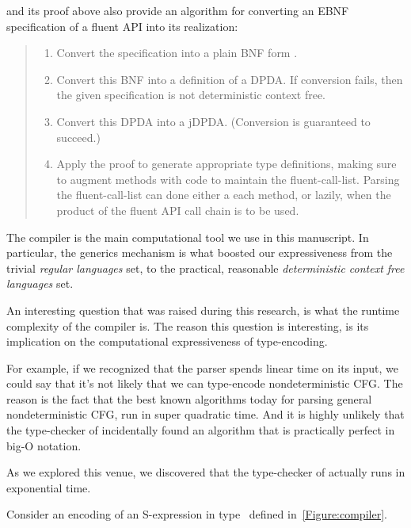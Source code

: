  and its proof above also provide
an algorithm for converting an EBNF specification of a fluent API into
its realization:
\begin{quote}
  \begin{enumerate}
    \item Convert the specification into a plain BNF form
    .
    \item Convert this BNF into a definition of a DPDA. If conversion fails,
      then the given specification is not deterministic context free. ~\cite{C1}
    \item Convert this DPDA into a jDPDA. (Conversion is guaranteed to succeed.) ~\cite{CONVERT}
    \item Apply the proof to generate appropriate \Java type definitions, making sure to
        augment methods with code to maintain the fluent-call-list.
        Parsing the fluent-call-list can done either a each method,
        or lazily, when the product of the fluent API call chain is to
         be used.
  \end{enumerate}
\end{quote}

The \Java compiler is the main computational tool we use
in this manuscript.
In particular, the \Java generics mechanism is what
boosted our expressiveness from the trivial \emph{regular languages}
set, to the practical, reasonable \emph{deterministic context free languages} set.

An interesting question that was raised during this research,
  is what the runtime complexity of the \Java compiler is.
The reason this question is interesting, is its implication
  on the computational expressiveness of type-encoding.

For example, if we recognized that the \Java parser spends
  linear time on its input, we could say that it's not
  likely that we can type-encode nondeterministic CFG\@.
The reason is the fact that the best known algorithms
  today for parsing general nondeterministic CFG,
  run in super quadratic time.
And it is highly unlikely that the type-checker of \Java incidentally
  found an algorithm that is practically perfect in big-O notation.

As we explored this venue, we discovered that the type-checker of
  \Java actually runs in exponential time.

Consider an encoding of an S-expression in type~
  defined in~\cref{Figure:compiler}.

